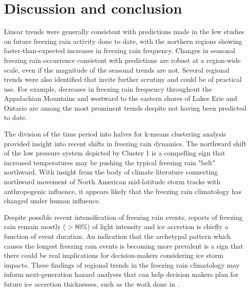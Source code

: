 \documentclass[twocol]{ametsoc}
\begin{document}
\section{Discussion and conclusion}
Linear trends were generally consistent with predictions made in the few studies on future freezing rain activity done to date, with the northern regions showing faster-than-expected increases in freezing rain frequency. Changes in seasonal freezing rain occurrence consistent with predictions are robust at a region-wide scale, even if the magnitude of the seasonal trends are not. Several regional trends were also identified that invite further scrutiny and could be of practical use. For example, decreases in freezing rain frequency throughout the Appalachian Mountains and westward to the eastern shores of Lakes Erie and Ontario are among the most prominent trends despite not having been predicted to date. 

The division of the time period into halves for k-means clustering analysis provided insight into recent shifts in freezing rain dynamics. The northward shift of the low pressure system depicted by Cluster 1 is a compelling sign that increased temperatures may be pushing the typical freezing rain "belt" northward. With insight from the body of climate literature connecting northward movement of North American mid-latitude storm tracks with anthropogenic influence, it appears likely that the freezing rain climatology has changed under human influence. 

Despite possible recent intensification of freezing rain events, reports of freezing rain remain mostly ($>$80\%) of light intensity and ice accretion is chiefly a function of event duration. An indication that the archetypal pattern which causes the longest freezing rain events is becoming more prevalent is a sign that there could be real implications for decision-makers considering ice storm impacts. These findings of regional trends in the freezing rain climatology may inform next-generation hazard analyses that can help decision makers plan for future ice accretion thicknesses, such as the work done in \citet{erfani2014aggregated}.
\end{document}
